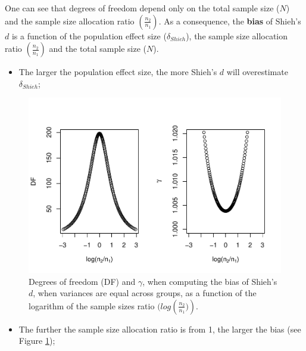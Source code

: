 \documentclass[
  english,
  man,mask]{apa6}
\providecommand{\tightlist}{%
  \setlength{\itemsep}{0pt}\setlength{\parskip}{0pt}}
\begin{document}
One can see that degrees of freedom depend only on the total sample size (\(N\)) and the sample size allocation ratio \(\left( \frac{n_2}{n_1}\right)\). As a consequence, the \textbf{bias} of Shieh's \(d\) is a function of the population effect size (\(\delta_{Shieh}\)), the sample size allocation ratio \(\left( \frac{n_2}{n_1}\right)\) and the total sample size (\(N\)).

\begin{itemize}
\tightlist
\item
  The larger the population effect size, the more Shieh's \(d\) will overestimate \(\delta_{Shieh}\);
\end{itemize}

\begin{figure}
\centering
\includegraphics{SupMat1_files/figure-latex/biasshiehhomNratio2-1.pdf}
\caption{\label{fig:biasshiehhomNratio2}Degrees of freedom (DF) and \(\gamma\), when computing the bias of Shieh's \(d\), when variances are equal across groups, as a function of the logarithm of the sample sizes ratio \((log \left(\frac{n_2}{n_1})\right)\).}
\end{figure}

\begin{itemize}
\tightlist
\item
  The further the sample size allocation ratio is from 1, the larger the bias (see Figure \ref{fig:biasshiehhomNratio2});
\end{itemize}
\end{document}

